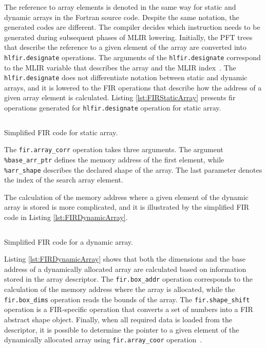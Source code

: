 \documentclass[acmtog,natbib=false]{acmart}
\newcommand{\code}[1]{\texttt{#1}\xspace}
\begin{document}
The reference to array elements is denoted in the same way for static and dynamic arrays in the Fortran source code.
Despite the same notation, the generated codes are different.
The compiler decides which instruction needs to be generated during subsequent phases of \ac{MLIR} lowering.
Initially, the \ac{PFT} trees that describe the reference to a given element of the array are converted into \code{hlfir.designate} operations.
The arguments of the \code{hlfir.designate} correspond to the \ac{MLIR} variable that describes the array and the \ac{MLIR} index~\cite{LLVM25}.
The \code{hlfir.designate} does not differentiate notation between static and dynamic arrays, and it is lowered to the FIR operations that describe how the address of a given array element is calculated.
Listing \ref{lst:FIRStaticArray} presents fir operations generated for \code{hlfir.designate} operation for static array.


\begin{listing}[t]
\inputminted{MLIR-lexer.py:MlirLexer -x}{code/FIR_static_array.mlir}
\caption{Simplified FIR code for static array.}
\label{lst:FIRStaticArray}
\end{listing}

The \code{fir.array\_corr} operation takes three arguments.
The argument \code{\%base\_arr\_ptr} defines the memory address of the first element, while \code{\%arr\_shape} describes the
declared shape of the array.
The last parameter denotes the index of the search array element.

The calculation of the memory address where a given element of the dynamic array is stored is more complicated, and it is illustrated by the simplified FIR code in Listing \ref{lst:FIRDynamicArray}.

\begin{listing}[t]
\inputminted{MLIR-lexer.py:MlirLexer -x}{code/FIR_dynamic_array.mlir}
\caption{Simplified FIR code for a dynamic array.}
\label{lst:FIRDynamicArray}
\end{listing}

Listing \ref{lst:FIRDynamicArray} shows that both the dimensions and the base address of a dynamically allocated array are calculated based on information stored in the array descriptor.
The \code{fir.box\_addr} operation corresponds to the calculation of the memory address where the array is allocated, while the \code{fir.box\_dims} operation reads the bounds of the array.
The \code{fir.shape\_shift} operation is a \ac{FIR}-specific operation that converts a set of numbers into a \ac{FIR} abstract shape object.
Finally, when all required data is loaded from the descriptor, it is possible to determine the pointer to a given element of the dynamically allocated array using \code{fir.array\_coor} operation~\cite{LLVM25}.
\end{document}
